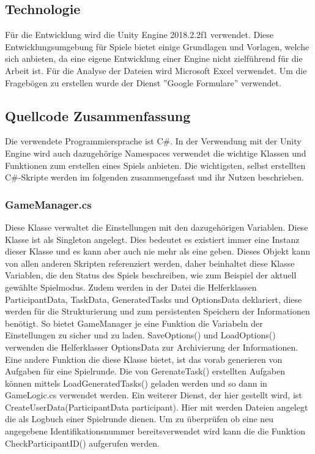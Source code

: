 \subsection{Technologie}
Für die Entwicklung wird die Unity Engine 2018.2.2f1 verwendet. Diese Entwicklungsumgebung für Spiele bietet einige Grundlagen und Vorlagen, welche sich anbieten, da eine eigene Entwicklung einer Engine nicht zielführend für die Arbeit ist. Für die Analyse der Dateien wird Microsoft Excel verwendet. Um die Fragebögen zu erstellen wurde der Dienst ''Google Formulare'' verwendet.

\subsection{Quellcode Zusammenfassung}
Die verwendete Programmiersprache ist C\#. In der Verwendung mit der Unity Engine wird auch dazugehörige Namespaces verwendet die wichtige Klassen und Funktionen zum erstellen eines Spiels anbieten. Die wichtigsten, selbst erstellten C\#-Skripte werden im folgenden zusammengefasst und ihr Nutzen beschrieben.
\subsubsection{GameManager.cs}
Diese Klasse verwaltet die Einstellungen mit den dazugehörigen Variablen. Diese Klasse ist als Singleton angelegt. Dies bedeutet es existiert immer eine Instanz dieser Klasse und es kann aber auch nie mehr als eine geben. Dieses Objekt kann von allen anderen Skripten referenziert werden, daher beinhaltet diese Klasse Variablen, die den Status des Spiels beschreiben, wie zum Beispiel der aktuell gewählte Spielmodus. Zudem werden in der Datei die Helferklassen ParticipantData, TaskData, GeneratedTasks und OptionsData deklariert, diese werden für die Strukturierung und zum persistenten Speichern der Informationen benötigt. So bietet GameManager je eine Funktion die Variabeln der Einstellungen zu sicher und zu laden. SaveOptions() und LoadOptions() verwenden die Helferklasser OptionsData zur Archivierung der Informationen. 
Eine andere Funktion die diese Klasse bietet, ist das vorab generieren von Aufgaben für eine Spielrunde.
Die von GerenateTask() erstellten Aufgaben können mittels LoadGeneratedTasks() geladen werden und so dann in GameLogic.cs verwendet werden.
Ein weiterer Dienst, der hier gestellt wird, ist CreateUserData(ParticipantData participant). Hier mit werden Dateien angelegt die als Logbuch einer Spielrunde dienen.
Um zu überprüfen ob eine neu angegebene Identifikationsnummer bereitsverwendet wird kann die die Funktion CheckParticipantID() aufgerufen werden.

